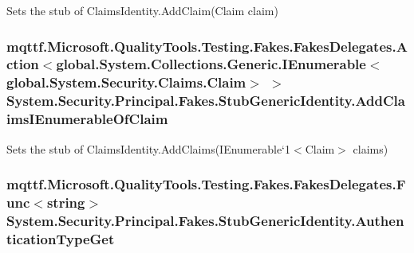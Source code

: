 Sets the stub of Claims\-Identity.\-Add\-Claim(\-Claim claim)

\hypertarget{class_system_1_1_security_1_1_principal_1_1_fakes_1_1_stub_generic_identity_ab3ae02d33ee89a2f32a737d9ede83d3a}{
\subsubsection[{Add\-Claims\-I\-Enumerable\-Of\-Claim}]{\setlength{\rightskip}{0pt plus 5cm}mqttf.\-Microsoft.\-Quality\-Tools.\-Testing.\-Fakes.\-Fakes\-Delegates.\-Action$<$global.\-System.\-Collections.\-Generic.\-I\-Enumerable$<$global.\-System.\-Security.\-Claims.\-Claim$>$ $>$ System.\-Security.\-Principal.\-Fakes.\-Stub\-Generic\-Identity.\-Add\-Claims\-I\-Enumerable\-Of\-Claim}}\label{class_system_1_1_security_1_1_principal_1_1_fakes_1_1_stub_generic_identity_ab3ae02d33ee89a2f32a737d9ede83d3a}


Sets the stub of Claims\-Identity.\-Add\-Claims(I\-Enumerable`1$<$Claim$>$ claims)

\hypertarget{class_system_1_1_security_1_1_principal_1_1_fakes_1_1_stub_generic_identity_ad840567928279fdfb03a30a87263aa90}{
\subsubsection[{Authentication\-Type\-Get}]{\setlength{\rightskip}{0pt plus 5cm}mqttf.\-Microsoft.\-Quality\-Tools.\-Testing.\-Fakes.\-Fakes\-Delegates.\-Func$<$string$>$ System.\-Security.\-Principal.\-Fakes.\-Stub\-Generic\-Identity.\-Authentication\-Type\-Get}}\label{class_system_1_1_security_1_1_principal_1_1_fakes_1_1_stub_generic_identity_ad840567928279fdfb03a30a87263aa90}


